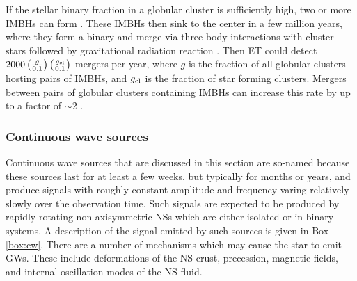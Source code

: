 
If the stellar binary fraction in a globular cluster is sufficiently high,
two or more IMBHs can form \cite{Fregeau:2006}.  These IMBHs
then sink to the center in a few million years, where they form a binary
and merge via three-body interactions with cluster stars followed
by gravitational radiation reaction \cite{Fregeau:2006,AmaroSeoane:2007aw}. 
Then ET could detect $2000 \left(\frac{g}{0.1}\right) \left(\frac{g_{\rm cl}}{0.1}\right)$ 
mergers per year, where $g$ is the fraction of all globular clusters
hosting pairs of IMBHs, and $g_{\rm cl}$ is the fraction of star forming
clusters.  Mergers between pairs of globular
clusters containing IMBHs can increase this rate by up to a factor of
$\sim 2$ \cite{AmaroSeoaneSantamaria:2009}.
\FloatBarrier

\FloatBarrier
\subsubsection{Continuous wave sources}

Continuous wave sources that are discussed in this section are so-named because
these sources last for at least a few weeks, but typically for months or years, and 
produce signals with roughly constant amplitude and frequency varing relatively 
slowly over the observation time.  Such signals are expected to be
produced by rapidly rotating non-axisymmetric NSs which are
either isolated or in binary systems. A description of the 
signal emitted by such sources is given in Box \ref{box:cw}. There are 
a number of mechanisms which may cause the star to 
emit GWs.  These include deformations of the
NS crust, precession, magnetic fields, and internal oscillation
modes of the NS fluid.  

